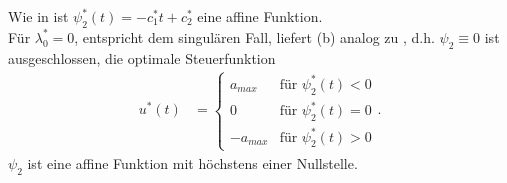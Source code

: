 \begin{exmp}
Wie in  ist $\psi_2^{\ast}(t)=-c_1^{\ast}t+c_2^{\ast}$ eine affine Funktion.\\ 
Für $\lambda_0^{\ast}=0$, entspricht dem singulären Fall, liefert (b) analog zu , d.h. $\psi_2\equiv 0$ ist
ausgeschlossen, die optimale Steuerfunktion
\begin{align*}
	u^{\ast}(t) & = \left\{\begin{array}{cl}
	a_{max} & \text{für }\psi_2^{\ast}(t) < 0\\
	0 & \text{für }\psi_2^{\ast}(t) = 0\\
	-a_{max} & \text{für }\psi_2^{\ast}(t) > 0
	\end{array} \right. .
\end{align*}
$\psi_2$ ist eine affine Funktion mit höchstens einer Nullstelle.


\end{exmp}
